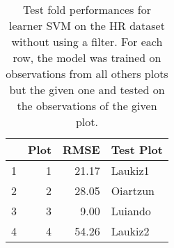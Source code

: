 \begin{table}[ht!]
\centering
\caption{Test fold performances for learner SVM on the HR dataset without using a filter. For each row, the model was trained on observations from all others plots but the given one and tested on the observations of the given plot.} 
\label{tab:svm-single-fold-perf}
\begin{tabular}{rrrl}
  \hline
 & Plot & RMSE & Test Plot \\ 
  \hline
1 &   1 & 21.17 & Laukiz1 \\ 
  2 &   2 & 28.05 & Oiartzun \\ 
  3 &   3 & 9.00 & Luiando \\ 
  4 &   4 & 54.26 & Laukiz2 \\ 
   \hline
\end{tabular}
\end{table}
